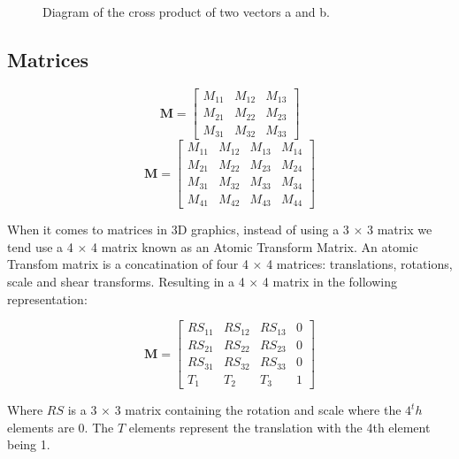 \begin{figure}[htbp]
	{\centering
		\setlength{\fboxrule}{1pt}
		\vspace{7px}
		\caption{Diagram of the cross product of two vectors a and b.}
	}
\end{figure}
\FloatBarrier

\subsection{Matrices}
\begin{equation}
\textbf{M} = \begin{bmatrix}
M_{11} & M_{12} & M_{13} \\
M_{21} & M_{22} & M_{23} \\
M_{31} & M_{32} & M_{33}
\end{bmatrix}
\end{equation}
\begin{equation}
\textbf{M} = \begin{bmatrix}
M_{11} & M_{12} & M_{13} & M_{14}\\
M_{21} & M_{22} & M_{23} & M_{24}\\
M_{31} & M_{32} & M_{33} & M_{34}\\
M_{41} & M_{42} & M_{43} & M_{44}
\end{bmatrix}
\end{equation}

\begin{flushleft}
When it comes to matrices in 3D graphics, instead of using a 3 $\times$ 3 matrix we tend use a 4 $\times$ 4 matrix known as an Atomic Transform Matrix. An atomic Transfom matrix is a concatination of four 4 $\times$ 4 matrices: translations, rotations, scale and shear transforms. Resulting in a 4 $\times$ 4 matrix in the following representation: 
\end{flushleft}

\begin{equation}
\textbf{M} = \begin{bmatrix}
RS_{11} & RS_{12} & RS_{13} & 0\\
RS_{21} & RS_{22} & RS_{23} & 0\\
RS_{31} & RS_{32} & RS_{33} & 0\\
T_{1} & T_{2} & T_{3} & 1
\end{bmatrix}
\end{equation}

\begin{flushleft}
Where $RS$ is a 3 $\times$ 3 matrix containing the rotation and scale where the $4^th$ elements are 0. The $T$ elements represent the translation with the 4th element being 1. 
\end{flushleft}

